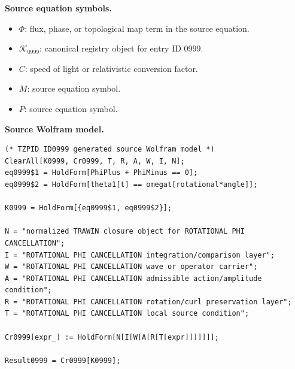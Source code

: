 \begin{minipage}[t]{0.49\linewidth}
\begingroup
\small
\raggedright
\textbf{Source equation symbols.}\par
\begin{itemize}[leftmargin=1.35em,itemsep=1pt,topsep=1pt,parsep=0pt]
    \item $\Phi$: flux, phase, or topological map term in the source equation.
    \item $\mathcal{K}_{0999}$: canonical registry object for entry ID 0999.
    \item $C$: speed of light or relativistic conversion factor.
    \item $M$: source equation symbol.
    \item $P$: source equation symbol.
\end{itemize}
\endgroup
\end{minipage}\hfill
\begin{minipage}[t]{0.47\linewidth}
\begingroup
\scriptsize
\raggedright
\textbf{Source Wolfram model.}\par
\begin{Verbatim}[fontsize=\tiny,breaklines=true,breakanywhere=true]
(* TZPID ID0999 generated source Wolfram model *)
ClearAll[K0999, Cr0999, T, R, A, W, I, N];
eq0999$1 = HoldForm[PhiPlus + PhiMinus == 0];
eq0999$2 = HoldForm[theta1[t] == omegat[rotational*angle]];

K0999 = HoldForm[{eq0999$1, eq0999$2}];

N = "normalized TRAWIN closure object for ROTATIONAL PHI CANCELLATION";
I = "ROTATIONAL PHI CANCELLATION integration/comparison layer";
W = "ROTATIONAL PHI CANCELLATION wave or operator carrier";
A = "ROTATIONAL PHI CANCELLATION admissible action/amplitude condition";
R = "ROTATIONAL PHI CANCELLATION rotation/curl preservation layer";
T = "ROTATIONAL PHI CANCELLATION local source condition";

Cr0999[expr_] := HoldForm[N[I[W[A[R[T[expr]]]]]]];

Result0999 = Cr0999[K0999];
\end{Verbatim}
\endgroup
\end{minipage}

